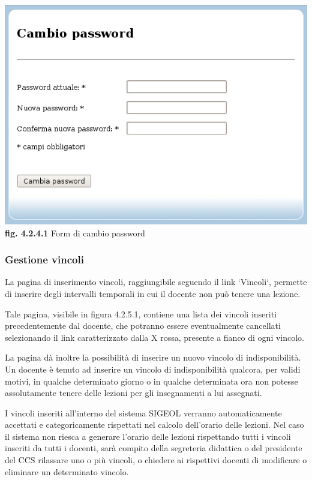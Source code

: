 \documentclass[11pt,a4paper]{article}
\begin{document}
\begin{center}
	\includegraphics[scale=0.5]{images/cambio_password.jpg}\\
	\textbf{fig. 4.2.4.1} Form di cambio password\\
\end{center}
\bigskip

\subsubsection{Gestione vincoli}
La pagina di inserimento vincoli, raggiungibile seguendo il link `Vincoli`, permette di inserire degli intervalli temporali in cui il docente non può tenere una lezione.

Tale pagina, visibile in figura 4.2.5.1, contiene una lista dei vincoli inseriti precedentemente dal docente, che potranno essere eventualmente cancellati selezionando il link caratterizzato dalla X rossa, presente a fianco di ogni vincolo.

La pagina dà inoltre la possibilità di inserire un nuovo vincolo di indisponibilità.
Un docente è tenuto ad inserire un vincolo di indisponibilità qualcora, per validi motivi, in qualche determinato giorno o in qualche determinata ora non potesse assolutamente tenere delle lezioni per gli insegnamenti a lui assegnati.

I vincoli inseriti all'interno del sistema SIGEOL verranno automaticamente accettati e categoricamente rispettati nel calcolo dell'orario delle lezioni.
Nel caso il sistema non riesca a generare l'orario delle lezioni rispettando tutti i vincoli inseriti da tutti i docenti, sarà compito della segreteria didattica o del presidente del CCS rilassare uno o più vincoli, o chiedere ai rispettivi docenti di modificare o eliminare un determinato vincolo.
\end{document}
